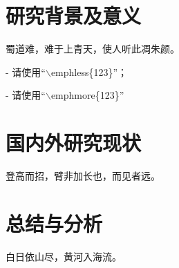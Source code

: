 \section{研究背景及意义}

蜀道难，难于上青天，使人听此凋朱颜。

- 请使用``$\backslash$emphless\{123\}''；

- 请使用``$\backslash$emphmore\{123\}''

\section{国内外研究现状}

登高而招，臂非加长也，而见者远\cite{govrpt_china_135,govrpt_china_145}。

\section{总结与分析}

白日依山尽，黄河入海流。
